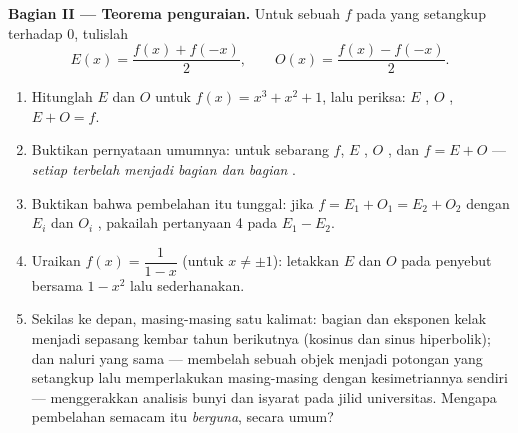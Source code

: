 \begin{problem}
\medskip
\noindent\textbf{Bagian II --- Teorema penguraian.}
Untuk sebuah  $f$ pada  yang setangkup terhadap $0$, tulislah
\[
E(x) = \frac{f(x) + f(-x)}{2},
\qquad
O(x) = \frac{f(x) - f(-x)}{2} .
\]
\begin{enumerate}[resume]
  \item Hitunglah $E$ dan $O$ untuk $f(x) = x^3 + x^2 + 1$, lalu
        periksa: $E$ , $O$ , $E + O = f$.
  \item Buktikan pernyataan umumnya: untuk sebarang $f$, 
        $E$ , $O$ , dan $f = E + O$ --- \emph{setiap
         terbelah menjadi bagian  dan bagian }.
  \item Buktikan bahwa pembelahan itu tunggal: jika
        $f = E_1 + O_1 = E_2 + O_2$ dengan $E_i$  dan $O_i$
        , pakailah pertanyaan 4 pada $E_1 - E_2$.
  \item Uraikan $f(x) = \dfrac{1}{1 - x}$ (untuk
        $x \neq \pm 1$): letakkan $E$ dan $O$ pada penyebut
        bersama $1 - x^2$ lalu sederhanakan.
  \item Sekilas ke depan, masing-masing satu kalimat: bagian  dan 
         eksponen kelak menjadi sepasang  kembar
        tahun berikutnya (kosinus dan sinus hiperbolik); dan
        naluri yang sama --- membelah sebuah objek menjadi potongan yang
        setangkup lalu memperlakukan masing-masing dengan kesimetriannya
        sendiri --- menggerakkan analisis bunyi dan isyarat pada jilid
        universitas. Mengapa pembelahan semacam itu \emph{berguna}, secara umum?
\end{enumerate}


\end{problem}
